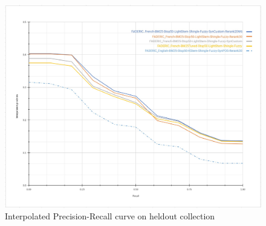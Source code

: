 \begin{figure}[tbp]
  \centering
  \includegraphics[width=1\linewidth]{figure/iprec-recall-HELDOUT.jpg}
  \caption{Interpolated Precision-Recall curve on heldout collection}
  \label{fig:precision-recall-curve-heldout}
\end{figure}

